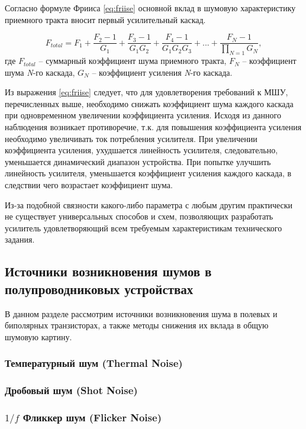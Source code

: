 Согласно формуле Фрииса \eqref{eq:friise} основной вклад в шумовую характеристику приемного тракта вносит первый усилительный каскад.

\begin{equation}
F_{total} = F_1 + \frac{{F_2 - 1}}{G_1} + \frac{{F_3 - 1}}{G_1 G_2} + \frac{F_4 - 1}{G_1 G_2 G_3} + ... + \frac{F_N - 1}{\prod\limits_{N=1} G_N},
\label{eq:friise}
\end{equation}
где \(F_{total}\) -- суммарный коэффициент шума приемного тракта, \(F_N\) -- коэффициент шума \textit{N}-го каскада, \(G_N\) -- коэффициент усиления \textit{N}-го каскада.

Из выражения \eqref{eq:friise} следует, что для удовлетворения требований к МШУ, перечисленных выше, необходимо снижать коэффициент шума каждого каскада при одновременном увеличении коэффициента усиления. Исходя из данного наблюдения возникает противоречие, т.к. для повышения коэффициента усиления необходимо увеличивать ток потребления усилителя. При увеличении коэффициента усиления, ухудшается линейность усилителя, следовательно, уменьшается динамический диапазон устройства. При попытке улучшить линейность усилителя, уменьшается коэффициент усиления каждого каскада, в следствии чего возрастает коэффициент шума.

Из-за подобной связности какого-либо параметра с любым другим практически не существует универсальных способов и схем, позволяющих разработать усилитель удовлетворяющий всем требуемым характеристикам технического задания.

\subsection{Источники возникновения шумов в полупроводниковых устройствах}
В данном разделе рассмотрим источники возникновения шума в полевых и биполярных транзисторах, а также методы снижения их вклада в общую шумовую картину.

\subsubsection{Температурный шум (Thermal Noise)}

\subsubsection{Дробовый шум (Shot Noise)}

\subsubsection{\(1/f\) Фликкер шум (Flicker Noise)}

